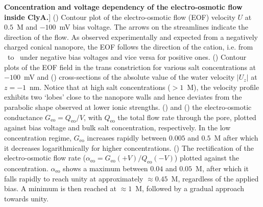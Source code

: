 \begin{figure*}[htbp]
\caption
[\textbf{Concentration and voltage dependency of the electro-osmotic flow inside ClyA.}]
{
()
Contour plot of the electro-osmotic flow (EOF) velocity $U$ at $0.5$~M and $-100$~mV bias voltage. The arrows 
on the streamlines indicate the direction of the flow. As observed experimentally\cite{Soskine-2013} and 
expected from a negatively charged conical nanopore, the EOF follows the direction of the cation, i.e. from 
\cis\ to \trans\ under negative bias voltages and vice versa for positive ones.
()
Contour plots of the EOF field in the trans constriction for various salt concentrations at $-100$~mV and
()
cross-sections of the absolute value of the water velocity $\left|U_z\right|$ at $z=-1$~nm. Notice that at 
high salt concentrations ($>1$~M), the velocity profile exhibits two `lobes' close to the nanopore walls and 
hence deviates from the parabolic shape observed at lower ionic strengths.
() and () the 
electro-osmotic conductance $G_\text{eo} = Q_\text{eo}/V$, with $Q_\text{eo}$ the total flow rate through
the pore, plotted against bias voltage and bulk salt concentration, respectively. In the low concentration 
regime, $G_\text{eo}$ increases rapidly between $0.005$ and $0.5$~M after which it decreases logarithmically 
for higher concentrations.
()
The rectification of the electro-osmotic flow rate ($\alpha_\text{eo} = G_\text{eo}(+V)/Q_\text{eo}(-V)$) 
plotted against the concentration. $\alpha_\text{eo}$ shows a maximum between $0.04$ and $0.05$~M, after 
which it falls rapidly to reach unity at approximately $\approx0.45$~M, regardless of the applied bias. A 
minimum is then reached at $\approx1$~M, followed by a gradual approach towards unity.
}

\label{fig:flow}

\end{figure*}